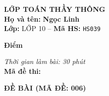 \noindent
\begin{tcolorbox}[colback=white,colframe=black,arc=0mm,boxrule=0.8pt,top=4pt,bottom=4pt,left=6pt,right=6pt]
	\begin{minipage}[c]{0.44\textwidth}
		{\bfseries\large LỚP TOÁN THẦY THÔNG}\\[3pt]
		\textbf{Họ và tên:} \textbf{\large Ngọc Linh}\\[3pt]
		\textbf{Lớp:} LỚP 10 \quad -- \quad \textbf{Mã HS:} \texttt{HS039}
	\end{minipage}
	\hfill
	\begin{minipage}[c]{0.22\textwidth}
		\begin{tcolorbox}[colback=white,colframe=black,arc=0mm,boxrule=0.6pt,height=1.8cm,halign=center,valign=top,top=2pt]
			{\bfseries\normalsize Điểm}
		\end{tcolorbox}
	\end{minipage}
	\hfill
	\begin{minipage}[c]{0.30\textwidth}
		\raggedleft
		\textit{Thời gian làm bài: 30 phút}\\[4pt]
		\textbf{Mã đề thi:} 
	\end{minipage}
\end{tcolorbox}
\vspace{0.25cm}

\noindent\textbf{\large ĐỀ BÀI (MÃ ĐỀ: 006)}
\vspace{0.1cm}

